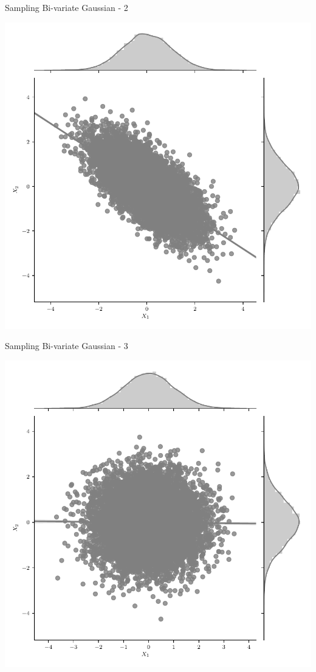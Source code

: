 \documentclass{beamer}
\begin{document}
\begin{frame}{Sampling Bi-variate Gaussian - 2}
	\begin{center}
		\includegraphics[height=\textheight -10pt ,keepaspectratio]{gp/2d-gp2}
	\end{center}
\end{frame}

\begin{frame}{Sampling Bi-variate Gaussian - 3}
	\begin{center}
		\includegraphics[height=\textheight -10pt ,keepaspectratio]{gp/2d-gp3}
	\end{center}
\end{frame}
\end{document}
